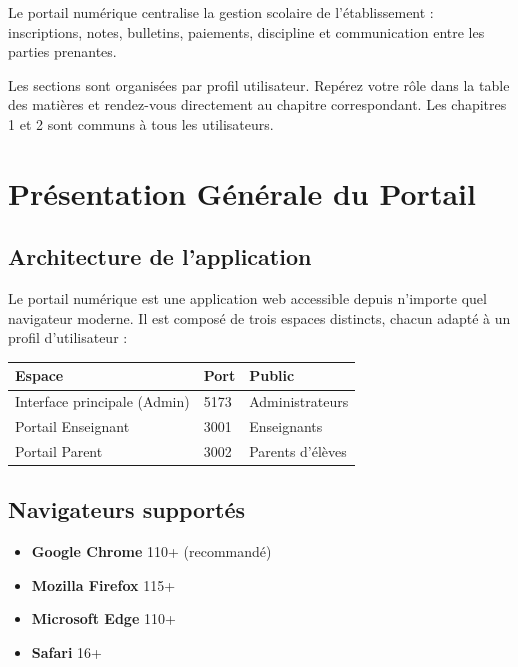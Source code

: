 \documentclass[12pt,a4paper]{report}
\begin{document}
Le portail numérique centralise la gestion scolaire de l'établissement : inscriptions, notes, bulletins, paiements, discipline et communication entre les parties prenantes.

\begin{infobox}
Les sections sont organisées par profil utilisateur. Repérez votre rôle dans la table des matières et rendez-vous directement au chapitre correspondant. Les chapitres 1 et 2 sont communs à tous les utilisateurs.
\end{infobox}

\chapter{Présentation Générale du Portail}

\section{Architecture de l'application}

Le portail numérique est une application web accessible depuis n'importe quel navigateur moderne. Il est composé de trois espaces distincts, chacun adapté à un profil d'utilisateur :

\begin{center}
\begin{tabular}{lll}
\toprule
\textbf{Espace} & \textbf{Port} & \textbf{Public} \\
\midrule
Interface principale (Admin) & 5173 & Administrateurs \\
Portail Enseignant & 3001 & Enseignants \\
Portail Parent     & 3002 & Parents d'élèves \\
\bottomrule
\end{tabular}
\end{center}

\section{Navigateurs supportés}

\begin{itemize}[leftmargin=*]
  \item \textbf{Google Chrome} 110+ (recommandé)
  \item \textbf{Mozilla Firefox} 115+
  \item \textbf{Microsoft Edge} 110+
  \item \textbf{Safari} 16+
\end{itemize}
\end{document}
